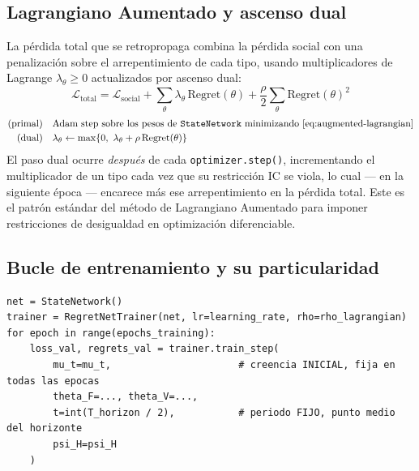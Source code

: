 \documentclass[ecta,nameyear,draft]{econsocart}
\newcommand{\pyvar}[1]{\texttt{#1}}
\begin{document}
\subsection{Lagrangiano Aumentado y ascenso dual}

La pérdida total que se retropropaga combina la pérdida social con una penalización sobre el
arrepentimiento de cada tipo, usando multiplicadores de Lagrange $\lambda_\theta \geq 0$
actualizados por ascenso dual:
\begin{equation}
\mathcal{L}_{\mathrm{total}} = \mathcal{L}_{\mathrm{social}}
+ \sum_\theta \lambda_\theta\, \mathrm{Regret}(\theta)
+ \frac{\rho}{2} \sum_\theta \mathrm{Regret}(\theta)^2
\label{eq:augmented-lagrangian}
\end{equation}
\begin{align}
\text{(primal)} \quad & \text{Adam step sobre los pesos de \pyvar{StateNetwork} minimizando \eqref{eq:augmented-lagrangian}} \\
\text{(dual)} \quad & \lambda_\theta \leftarrow \max\{0,\ \lambda_\theta + \rho\, \mathrm{Regret}(\theta)\}
\end{align}
El paso dual ocurre \emph{después} de cada \pyvar{optimizer.step()}, incrementando el
multiplicador de un tipo cada vez que su restricción IC se viola, lo cual --- en la siguiente
época --- encarece más ese arrepentimiento en la pérdida total. Este es el patrón estándar del
método de Lagrangiano Aumentado para imponer restricciones de desigualdad en optimización
diferenciable.

\subsection{Bucle de entrenamiento y su particularidad}\label{sec:training-caveat}

\begin{lstlisting}
net = StateNetwork()
trainer = RegretNetTrainer(net, lr=learning_rate, rho=rho_lagrangian)
for epoch in range(epochs_training):
    loss_val, regrets_val = trainer.train_step(
        mu_t=mu_t,                      # creencia INICIAL, fija en todas las epocas
        theta_F=..., theta_V=...,
        t=int(T_horizon / 2),           # periodo FIJO, punto medio del horizonte
        psi_H=psi_H
    )
\end{lstlisting}
\end{document}
